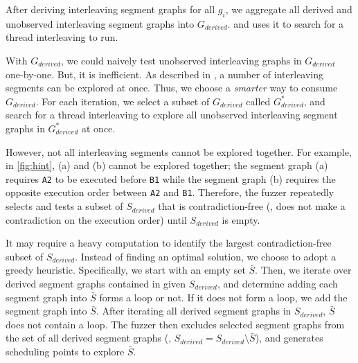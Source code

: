 After deriving interleaving segment graphs for all $g_i$, we aggregate
all derived and unobserved interleaving segment graphs into
$G_{derived}$. and uses it to search for a thread interleaving to run.







%
With $G_{derived}$, we could naively test unobserved interleaving
graphs in $G_{derived}$ one-by-one. But, it is inefficient. As
described in \dr{}, a number of interleaving segments can be explored
at once.
%
Thus, we choose a \textit{smarter} way to consume $G_{derived}$.
%
For each iteration, we select a subset of $G_{derived}$ called
$G^{*}_{derived}$, and search for a thread interleaving to explore all
unobserved interleaving segment graphs in $G^{*}_{derived}$ at once.

%




However, not all interleaving segments cannot be explored together.
%
For example, in \autoref{fig:hint}, (a) and (b) cannot be explored
together; the segment graph (a) requires \texttt{A2} to be executed
before \texttt{B1} while the segment graph (b) requires the opposite
execution order between \texttt{A2} and \texttt{B1}.
%
Therefore, the fuzzer repeatedly selects and tests a subset of
$S_{derived}$ that is contradiction-free (\ie, does not make a
contradiction on the execution order) until $S_{derived}$ is empty.


It may require a heavy computation to identify the largest
contradiction-free subset of $S_{derived}$.
%
Instead of finding an optimal solution, we choose to adopt a greedy
heuristic.
%
Specifically, we start with an empty set $\bar{S}$. Then, we iterate
over derived segment graphs contained in given $S_{derived}$, and
determine adding each segment graph into $\bar{S}$ forms a loop or
not. If it does not form a loop, we add the segment graph into
$\bar{S}$.
%
After iterating all derived segment graphs in $S_{derived}$, $\bar{S}$
does not contain a loop. The fuzzer then excludes selected segment
graphs from the set of all derived segment graphs (\ie,
$S_{derived} = S_{derived} \setminus \bar{S}$), and generates
scheduling points to explore $\bar{S}$.










